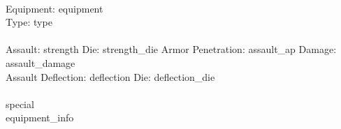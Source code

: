  \\
Equipment: {equipment} \\
Type: {type} \\
\ \\
Assault: {strength} Die: {strength_die} Armor Penetration: {assault_ap} Damage: {assault_damage} \\
Assault Deflection: {deflection} Die: {deflection_die}\\
\ \\
{special}
\ \\
{equipment_info} 
\ \\


